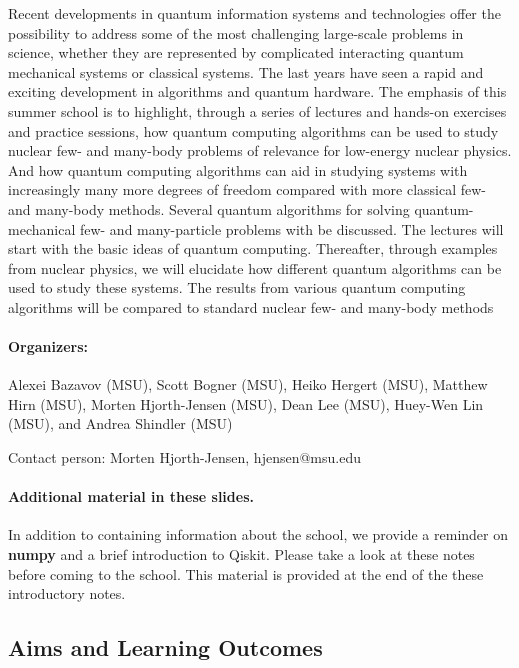 \documentclass[%
oneside,                 %
final,                   %
10pt]{article}
\begin{document}
Recent developments in quantum information systems and technologies
offer the possibility to address some of the most challenging
large-scale problems in science, whether they are represented by
complicated interacting quantum mechanical systems or classical
systems. The last years have seen a rapid and exciting development in
algorithms and quantum hardware.  The emphasis of this summer school
is to highlight, through a series of lectures and hands-on exercises
and practice sessions, how quantum computing algorithms can be used to
study nuclear few- and many-body problems of relevance for low-energy
nuclear physics.  And how quantum computing algorithms can aid in
studying systems with increasingly many more degrees of freedom
compared with more classical few- and many-body methods.  Several
quantum algorithms for solving quantum-mechanical few- and
many-particle problems with be discussed.  The lectures will start
with the basic ideas of quantum computing. Thereafter, through
examples from nuclear physics, we will elucidate how different quantum
algorithms can be used to study these systems. The results from
various quantum computing algorithms will be compared to standard
nuclear few- and many-body methods 

\paragraph{Organizers:}
Alexei Bazavov (MSU), Scott Bogner (MSU), Heiko Hergert (MSU), Matthew Hirn (MSU), Morten Hjorth-Jensen (MSU), Dean Lee (MSU), Huey-Wen Lin (MSU), and Andrea Shindler (MSU)

Contact person: Morten Hjorth-Jensen, hjensen@msu.edu

\paragraph{Additional material in these slides.}
In addition to containing information about the school, we provide a reminder on \textbf{numpy} and a brief introduction to Qiskit. Please take a look at these notes before coming to the school. This material is provided at the end of the these introductory notes.

\subsection*{Aims and Learning Outcomes}
\end{document}
